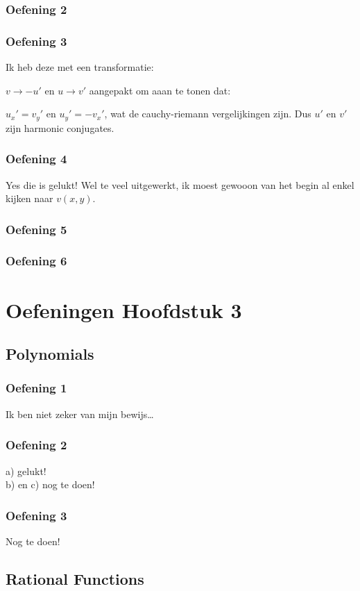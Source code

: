 \documentclass[a4paper,twoside]{article}
\theoremstyle{definition}
\theoremstyle{plain}
\begin{document}
\subsubsection{Oefening 2}
\subsubsection{Oefening 3}
Ik heb deze met een transformatie:

\(v \to -u'\) en \(u \to v'\) aangepakt om aaan te tonen dat:

\(u_x' = v_y'\) en \(u_y' = - v_x'\), wat de cauchy-riemann vergelijkingen zijn.
Dus \(u'\) en \(v'\) zijn harmonic conjugates.
\subsubsection{Oefening 4}
Yes die is gelukt! Wel te veel uitgewerkt, ik moest gewooon van het begin al enkel kijken naar \(v(x,y)\).
\subsubsection{Oefening 5}
\subsubsection{Oefening 6}
\section{Oefeningen Hoofdstuk 3}
\subsection{Polynomials}
\subsubsection{Oefening 1}
Ik ben niet zeker van mijn bewijs\dots
\subsubsection{Oefening 2}
a) gelukt!\\
b) en c) nog te doen!
\subsubsection{Oefening 3}
Nog te doen!
\subsection{Rational Functions}
\end{document}
